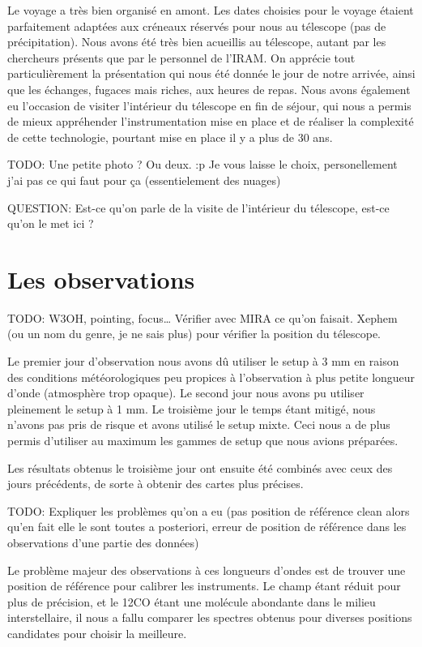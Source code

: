 \documentclass[a4paper,10pt,french]{article}
\begin{document}
Le voyage a très bien organisé en amont. Les dates choisies pour le voyage étaient parfaitement adaptées aux créneaux réservés pour nous au télescope (pas de précipitation). Nous avons été très bien acueillis au télescope, autant par les chercheurs présents que par le personnel de l'IRAM. On apprécie tout particulièrement la présentation qui nous été donnée le jour de notre arrivée, ainsi que les échanges, fugaces mais riches, aux heures de repas. 
Nous avons également eu l'occasion de visiter l'intérieur du télescope en fin de séjour, qui nous a permis de mieux appréhender l'instrumentation mise en place et de réaliser la complexité de cette technologie, pourtant mise en place il y a plus de 30 ans.

TODO: Une petite photo ? Ou deux. :p Je vous laisse le choix, personellement j'ai pas ce qui faut pour ça (essentielement des nuages)

QUESTION: Est-ce qu’on parle de la visite de l’intérieur du télescope, est-ce
qu’on le met ici ?

\section{Les observations}

TODO: W3OH, pointing, focus… Vérifier avec MIRA ce qu’on faisait. Xephem (ou un
nom du genre, je ne sais plus) pour vérifier la position du télescope.

Le premier jour d'observation nous avons dû utiliser le setup à 3 mm en raison des
conditions météorologiques peu propices à l'observation à plus petite longueur d'onde
(atmosphère trop opaque). Le second jour nous avons pu utiliser pleinement le setup à 1 mm.
Le troisième jour le temps étant mitigé, nous n'avons pas pris de risque et avons utilisé 
le setup mixte. Ceci nous a de plus permis d'utiliser au maximum les gammes de setup que
 nous avions préparées.
 
 Les résultats obtenus le troisième jour ont ensuite été combinés avec ceux des jours précédents, de sorte à obtenir des cartes plus précises.

TODO: Expliquer les problèmes qu’on a eu (pas position de référence clean alors
qu’en fait elle le sont toutes a posteriori, erreur de position de référence
dans les observations d’une partie des données)

Le problème majeur des observations à ces longueurs d'ondes est de trouver une position de référence pour calibrer les instruments.
Le champ étant réduit pour plus de précision, et le 12CO étant une molécule abondante dans le milieu interstellaire, il nous a fallu comparer les spectres obtenus pour diverses positions candidates pour choisir la meilleure.
\end{document}

